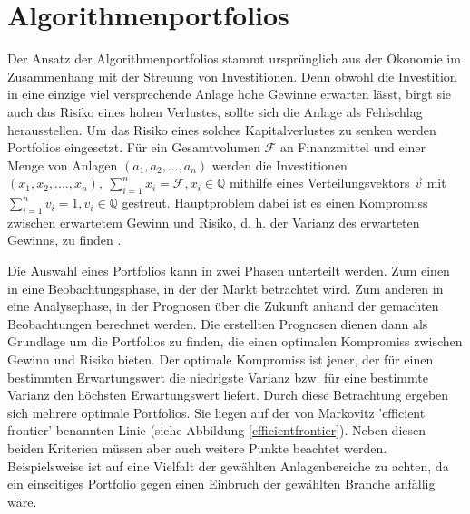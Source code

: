 \section{Algorithmenportfolios}

Der Ansatz der Algorithmenportfolios stammt ursprünglich aus der Ökonomie im Zusammenhang mit der Streuung von Investitionen. Denn obwohl die Investition in eine einzige viel versprechende Anlage hohe Gewinne erwarten lässt, birgt sie auch das Risiko eines hohen Verlustes, sollte sich die Anlage als Fehlschlag herausstellen. Um das Risiko eines solches Kapitalverlustes zu senken werden Portfolios eingesetzt. Für ein Gesamtvolumen $\mathcal{F}$ an Finanzmittel und einer Menge von Anlagen $ (a_1, a_2, ... ,  a_n) $ werden die Investitionen $ (x_1, x_2, .... , x_n),~ \sum_{i=1}^n{x_i} = \mathcal{F}, x_i \in \mathbb{Q}$ mithilfe eines Verteilungsvektors $ \vec v $ mit $ \sum_{i=1}^n{v_i} = 1, v_i \in \mathbb{Q}$ gestreut. Hauptproblem dabei ist es einen Kompromiss zwischen erwartetem Gewinn und Risiko, d. h. der Varianz des erwarteten Gewinns, zu finden \cite{markowitz1}.

Die Auswahl eines Portfolios kann in zwei Phasen unterteilt werden. Zum einen in eine Beobachtungsphase, in der der Markt betrachtet wird. Zum anderen in eine Analysephase, in der Prognosen über die Zukunft anhand der gemachten Beobachtungen berechnet werden. Die erstellten Prognosen dienen dann als Grundlage um die Portfolios zu finden, die einen optimalen Kompromiss zwischen Gewinn und Risiko bieten. Der optimale Kompromiss ist jener, der für einen bestimmten Erwartungswert die niedrigste Varianz bzw. für eine bestimmte Varianz den höchsten Erwartungswert liefert. Durch diese Betrachtung ergeben sich mehrere optimale Portfolios. Sie liegen auf der von Markovitz 'efficient frontier' benannten Linie (siehe Abbildung \ref{efficientfrontier}). Neben diesen beiden Kriterien müssen aber auch weitere Punkte beachtet werden. Beispielsweise ist auf eine Vielfalt der gewählten Anlagenbereiche zu achten, da ein einseitiges Portfolio gegen einen Einbruch der gewählten Branche anfällig wäre. \\

